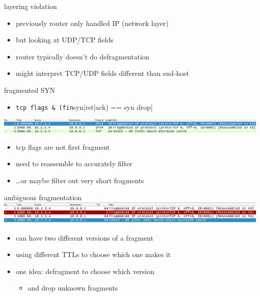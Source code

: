 \begin{frame}{layering violation}
    \begin{itemize}
    \item previously router only handled IP (network layer)
    \item but looking at UDP/TCP fields
    \vspace{.5cm}
    \item router typically doesn't do defragmentation
    \item might interpret TCP/UDP fields different than end-host
    \end{itemize}
\end{frame}

\begin{frame}[fragile]{fragmented SYN}
    \begin{itemize}
    \item \verb|tcp flags & (fin|syn|rst|ack) == syn drop|
    \end{itemize}
\includegraphics[width=\textwidth]{../fire/tcp-syn-frag}
    \begin{itemize}
    \item tcp flags are not first fragment
    \item need to reassemble to accurately filter
    \item \ldots or maybe filter out very short fragments
    \end{itemize}
\end{frame}

\begin{frame}[fragile]{ambiguous fragmentation}
\includegraphics[width=\textwidth]{../fire/tcp-syn-ambig-frag}
    \begin{itemize}
    \item can have two different versions of a fragment
    \item using different TTLs to choose which one makes it
    \vspace{.5cm}
    \item one idea: defragment to choose which version 
        \begin{itemize}
        \item and drop unknown fragments
        \end{itemize}
    \end{itemize}
\end{frame}

